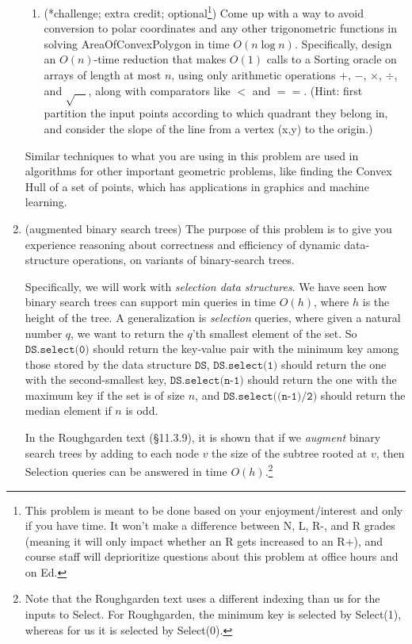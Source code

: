\documentclass[11pt]{article}
\begin{document}
\begin{enumerate}
\begin{enumerate}
        \item (*challenge; extra credit; optional\footnote{This problem is meant to be done based on your enjoyment/interest and only if you have time. It won't make a difference between N, L, R-, and R grades (meaning it will only impact whether an R gets increased to an R+), and course staff will deprioritize questions about this problem at office hours and on Ed.})  Come up with a way to avoid conversion to polar coordinates and any other trigonometric functions in solving AreaOfConvexPolygon in time $O(n\log n)$.  Specifically, design an $O(n)$-time reduction that makes $O(1)$ calls to a Sorting oracle on arrays of length at most $n$, using only arithmetic operations $+$, $-$, $\times$, $\div$, and $\sqrt{\hspace{1em}}$, along with comparators like $<$ and $==$.  (Hint: first partition the input points according to which quadrant they belong in, and consider the slope of the line from a vertex (x,y) to the origin.) \label{part:nopolar}

\end{enumerate}
    
    Similar techniques to what you are using in this problem are used in algorithms for other important geometric problems, like finding the Convex Hull of a set of points, which has applications in graphics and machine learning.
    
    \newpage

    
    \item (augmented binary search trees) The purpose of this problem is to give you experience reasoning about correctness and efficiency of dynamic data-structure operations, on variants of binary-search trees. 
    
    Specifically, we will work with {\em selection data structures}.
    We have seen how binary search trees can support min queries in time $O(h)$, where $h$ is the height of the tree.  A generalization is {\em selection} queries, where given a natural number $q$, we want to return the $q$'th smallest element of the set.  So $\texttt{DS.select(0)}$ should return the key-value pair with the minimum key among those stored by the data structure $\texttt{DS}$, $\texttt{DS.select(1)}$ should return the one with the second-smallest key, $\texttt{DS.select(n-1)}$ should return the one with the maximum key if the set is of size $n$, and $\texttt{DS.select((n-1)/2)}$ should return the median element if $n$ is odd.
    
    In the Roughgarden text (\S11.3.9), it is shown that if we {\em augment} binary search trees by adding to each node $v$ the size of the subtree rooted at $v$, then Selection queries can be answered in time $O(h)$.\footnote{Note that the Roughgarden text uses a different indexing than us for the inputs to Select. For Roughgarden, the minimum key is selected by Select(1), whereas for us it is selected by Select(0).}
    

\end{enumerate}
\end{document}
